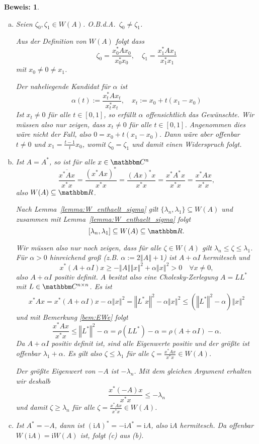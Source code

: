 \documentclass[12pt,a4paper]{book}
\theoremstyle{break}
\theoremstyle{nonumberplain}
\newtheorem{beweis}{Beweis:}
\newcommand{\C}{\mathbbm C}
\newcommand{\R}{\mathbbm R}
\newcommand{\norm}[1]{\left\Vert#1\right\Vert}		%
\newcommand{\1}{\mathbbm{1}} 			      	%
\newcommand{\im}{\ensuremath{\mathrm{i}}} 			      	%
\begin{document}
\begin{beweis}
\begin{enumerate}[(a)]
\item Seien $\zeta_0, \zeta_1\in W(A)$. O.B.d.A.\ $\zeta_0\neq \zeta_1$. 

Aus der Definition von $W(A)$ folgt dass
\[
\zeta_0=\frac{x_0^* A x_0}{x_0^*x_0}, \quad \zeta_1=\frac{x_1^* A x_1}{x_1^*x_1}
\]
mit $x_0\neq 0 \neq x_1$. 

Der naheliegende Kandidat für $\alpha$ ist
\[
\alpha(t):=\frac{x_t^* A x_t}{x_t^*x_t}, \quad x_t:=x_0+t(x_1-x_0)
\]
Ist $x_t\neq 0$ für alle $t\in [0,1]$, so erfüllt $\alpha$ offensichtlich das Gewünschte.
Wir müssen also nur zeigen, dass $x_t\neq 0$ für alle $t\in [0,1]$.
Angenommen dies wäre nicht der Fall, also $0=x_0+t(x_1-x_0)$. Dann wäre 
aber offenbar $t\neq 0$ und $x_1=\frac{t-1}{t} x_0$, womit $\zeta_0=\zeta_1$ und damit 
einen Widerspruch folgt.
%
\item Ist $A=A^*$, so ist für alle $x\in \C^n$
\[
\overline{\frac{x^* A x}{x^*x}}=\frac{( x^* A x )^*}{x^*x}
= \frac{ (A x)^* x}{x^*x}=\frac{ x^* A^* x}{x^*x}
=\frac{ x^* A x}{x^*x},
\]
also $W(A)\subseteq \R$.

Nach Lemma~\ref{lemma:W_enthaelt_sigma} gilt $\{\lambda_n,\lambda_1\}\subseteq W(A)$ und
zusammen mit Lemma~\ref{lemma:W_enthaelt_sigma} folgt 
\[
[\lambda_n,\lambda_1]\subseteq W(A)\subseteq \R.
\] 
 
Wir müssen also nur noch zeigen, dass für alle $\zeta\in W(A)$ gilt $\lambda_n\leq \zeta\leq \lambda_1$.
Für $\alpha>0$ hinreichend groß (z.B. $\alpha:=2\norm{A}+1$) ist $A+\alpha I$ hermitesch und 
\[
x^*(A+\alpha I)x\geq -\norm{A}\norm{x}^2 + \alpha \norm{x}^2>0 \quad \forall x\neq 0,
\]
also $A+\alpha I$ positiv definit. $A$ besitzt also eine Cholesky-Zerlegung $A=LL^*$ mit $L\in \C^{n\times n}$.
Es ist
\begin{align*}
x^*A x = x^* (A+\alpha I) x- \alpha \norm{x}^2= \norm{L^*x}^2 - \alpha \norm{x}^2\leq (\norm{L^*}^2-\alpha)\norm{x}^2
\end{align*}
und mit Bemerkung \ref{bem:EWe} folgt
\[
\frac{x^*A x}{x^* x} \leq \norm{L^*}^2-\alpha=\rho(LL^*)-\alpha=\rho(A+\alpha I)-\alpha.
\]
Da $A+\alpha I$ positiv definit ist, sind alle Eigenwerte positiv und der größte ist offenbar $\lambda_1+\alpha$.
Es gilt also $\zeta\leq \lambda_1$ für alle $\zeta=\frac{x^*A x}{x^* x}\in W(A)$. 

Der größte Eigenwert von $-A$ ist $-\lambda_n$. Mit dem gleichen Argument erhalten wir deshalb
\[
\frac{x^* (-A) x}{x^* x} \leq -\lambda_n
\]
und damit $\zeta\geq \lambda_n$ für alle $\zeta=\frac{x^*A x}{x^* x}\in W(A)$.

\item Ist $A^*=-A$, dann ist $(\im A)^*=-\im A^*=\im A$, also $\im A$ hermitesch. Da offenbar $W(\im A)=\im W(A)$ ist, folgt (c) aus (b).
\end{enumerate}
\end{beweis}
\end{document}
